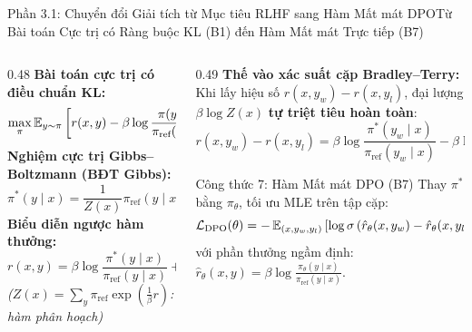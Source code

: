 \begin{frame}{Phần 3.1: Chuyển đổi Giải tích từ Mục tiêu RLHF sang Hàm Mất mát DPO}{Từ Bài toán Cực trị có Ràng buộc KL (B1) đến Hàm Mất mát Trực tiếp (B7)}
  \begin{columns}[T,onlytextwidth]
    \begin{column}{0.48\textwidth}
      \footnotesize
      \textbf{Bài toán cực trị có điều chuẩn KL:}
      \[
        \max_{\pi} \operatorname{\mathbb{E}}_{y \sim \pi} \left[ r(x, y) - \beta \log \frac{\pi(y \mid x)}{\pi_{\text{ref}}(y \mid x)} \right]
      \]
      \textbf{Nghiệm cực trị Gibbs--Boltzmann (BĐT Gibbs):}
      \[
        \pi^*(y \mid x) = \frac{1}{Z(x)} \pi_{\text{ref}}(y \mid x) \exp\left(\frac{1}{\beta} r(x, y)\right)
      \]
      \textbf{Biểu diễn ngược hàm thưởng:}
      \[
        \boxed{r(x, y) = \beta \log \frac{\pi^*(y \mid x)}{\pi_{\text{ref}}(y \mid x)} + \beta \log Z(x)}
      \]
      \textit{\scriptsize($Z(x) = \sum_{y} \pi_{\text{ref}}\exp(\frac{1}{\beta}r)$: hàm phân hoạch)}
    \end{column}

    \begin{column}{0.49\textwidth}
      \footnotesize
      \textbf{Thế vào xác suất cặp Bradley--Terry:}\\
      Khi lấy hiệu số $r(x, y_w) - r(x, y_l)$, đại lượng $\beta \log Z(x)$ \textbf{tự triệt tiêu hoàn toàn}:
      \[
        r(x, y_w) - r(x, y_l) = \beta \log \frac{\pi^*(y_w \mid x)}{\pi_{\text{ref}}(y_w \mid x)} - \beta \log \frac{\pi^*(y_l \mid x)}{\pi_{\text{ref}}(y_l \mid x)}
      \]
      \vspace{-0.15cm}
      \begin{block}{Công thức 7: Hàm Mất mát DPO (B7)}
        \scriptsize
        Thay $\pi^*$ bằng $\pi_\theta$, tối ưu MLE trên tập cặp:
        \[
          \mathcal{L}_{\text{DPO}}(\theta) = -\operatorname{\mathbb{E}}_{(x, y_w, y_l)} \left[ \log \sigma \left( \hat{r}_\theta(x, y_w) - \hat{r}_\theta(x, y_l) \right) \right]
        \]
        với phần thưởng ngầm định:
        $\hat{r}_\theta(x, y) = \beta \log \frac{\pi_\theta(y \mid x)}{\pi_{\text{ref}}(y \mid x)}$.
      \end{block}
    \end{column}
  \end{columns}
\end{frame}


